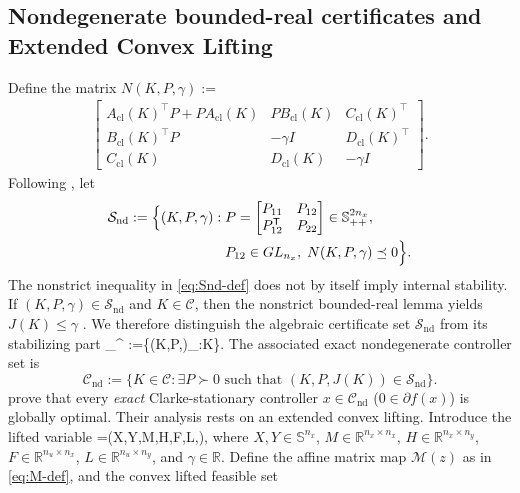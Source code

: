 \documentclass[letterpaper,10pt,conference]{ieeeconf}
\def\[#1\]{\begin{align*}#1\end{align*}}
\providecommand{\R}{\mathbb{R}}
\providecommand{\Sbb}{\mathbb{S}}
\providecommand{\cC}{\mathcal{C}}
\providecommand{\cS}{\mathcal{S}}
\providecommand{\cM}{\mathcal{M}}
\providecommand{\transpose}{\mathsf{T}}
\renewcommand{\^}[1]{^{(#1)}}
\begin{document}
\subsection{Nondegenerate bounded-real certificates and Extended Convex Lifting}
Define the matrix $ N(K,P,\gamma) := $ 
\begin{equation}\label{eq:N-def}
\begin{aligned}
\left[
\begin{array}{ccc}
A_{\mathrm{cl}}(K)^\top P + P A_{\mathrm{cl}}(K) & P B_{\mathrm{cl}}(K) & C_{\mathrm{cl}}(K)^\top \\
B_{\mathrm{cl}}(K)^\top P & -\gamma I & D_{\mathrm{cl}}(K)^\top \\
C_{\mathrm{cl}}(K) & D_{\mathrm{cl}}(K) & -\gamma I
\end{array}
\right].
\end{aligned}
\end{equation}
Following \citet{tang2023global}, let
\begin{equation}\label{eq:Snd-def}
\begin{aligned}
\cS_{\mathrm{nd}}
:=
\Bigl\{(K,P,\gamma):\;&
P=\begin{bmatrix}P_{11}&P_{12}\\P_{12}^\transpose&P_{22}\end{bmatrix}\in\Sbb^{2n_x}_{++},\\
& P_{12}\in GL_{n_x},\;
N(K,P,\gamma)\preceq 0
\Bigr\}.
\end{aligned}
\end{equation}
The nonstrict inequality in \eqref{eq:Snd-def} does not by itself imply internal stability. If $(K,P,\gamma)\in\cS_{\mathrm{nd}}$ and $K\in\cC$, then the nonstrict bounded-real lemma yields $J(K)\le\gamma$ \citep{tang2023global}. We therefore distinguish the algebraic certificate set $\cS_{\mathrm{nd}}$ from its stabilizing part
\[
\cS_{}^{}
:=\{(K,P,\gamma)\in\cS_{}:K\in\cC\}.
\]
The associated exact nondegenerate controller set is
\begin{equation}\label{eq:Cnd-def}
\cC_{\mathrm{nd}}:=\{K\in\cC:\exists P\succ 0\text{ such that }(K,P,J(K))\in\cS_{\mathrm{nd}}\}.
\end{equation}
\citet{tang2023global} prove that every \emph{exact} Clarke-stationary controller $x \in \cC_{\mathrm{nd}}$ ($0 \in \partial f(x)$) is globally optimal. Their analysis rests on an extended convex lifting. Introduce the lifted variable
\[
z=(X,Y,M,H,F,L,\gamma),
\]
where $X,Y\in\Sbb^{n_x}$, $M\in\R^{n_x\times n_x}$, $H\in\R^{n_x\times n_y}$, $F\in\R^{n_u\times n_x}$, $L\in\R^{n_u\times n_y}$, and $\gamma\in\R$. Define the affine matrix map $\cM(z)$ as in \eqref{eq:M-def}, and the convex lifted feasible set
\end{document}
